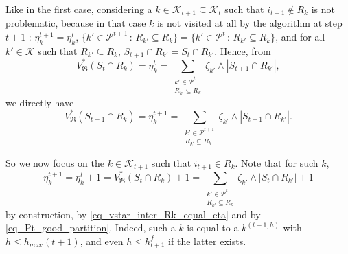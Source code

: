 \documentclass[
  11pt,
  a4paper,
]{article}
\theoremstyle{plain}
\theoremstyle{definition}
\theoremstyle{plain}
\theoremstyle{definition}
\theoremstyle{plain}
\theoremstyle{remark}
\begin{document}
Like in the first case, considering a
\(k\in\mathcal{K}_{t+1}\subseteq \mathcal{K}_t\) such that
\(i_{t+1}\not\in R_k\) is not problematic, because in that case \(k\) is
not visited at all by the algorithm at step \(t+1\) :
\(\eta^{t+1}_k=\eta^{t}_k\),
\(\{k'\in\mathcal{P}^{t+1}\,:\,R_{k'}\subseteq R_k\}=\{k'\in\mathcal{P}^{t}\,:\,R_{k'}\subseteq R_k\}\),
and for all \(k'\in \mathcal{K}\) such that \(R_{k'}\subseteq R_k\),
\(S_{t+1}\cap R_{k'}=S_{t}\cap R_{k'}\). Hence, from \begin{equation*}
V^*_{\mathfrak{R}}(S_{t}\cap R_k) =  \eta_k^{t} =  \sum_{\substack{k'\in\mathcal{P}^{t}\\R_{k'}\subseteq R_k}} \zeta_{k'}\wedge |S_{t+1}\cap R_{k'}| ,
\end{equation*} we directly have \begin{equation*}
V^*_{\mathfrak{R}}(S_{t+1}\cap R_k) =  \eta_k^{t+1} =  \sum_{\substack{k'\in\mathcal{P}^{t+1}\\R_{k'}\subseteq R_k}} \zeta_{k'}\wedge |S_{t+1}\cap R_{k'}| .
\end{equation*}

So we now focus on the \(k\in\mathcal{K}_{t+1}\) such that
\(i_{t+1}\in R_k\). Note that for such \(k\), \begin{equation*}
\eta^{t+1}_k=\eta^t_k+1=V^*_{\mathfrak{R}}(S_t\cap R_k)+1=\sum_{\substack{k'\in \mathcal{P}^t\\ R_{k'}\subseteq R_k}}\zeta_{k'}\wedge|S_t\cap R_{k'}|+1
\end{equation*} by construction, by \eqref{eq_vstar_inter_Rk_equal_eta}
and by \eqref{eq_Pt_good_partition}. Indeed, such a \(k\) is equal to a
\(k^{(t+1,h)}\) with \(h\leq h_{max}(t+1)\), and even
\(h\leq h^f_{t+1}\) if the latter exists.
\end{document}
